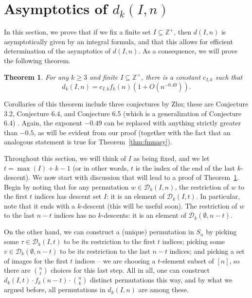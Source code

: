 \documentclass{amsart}
\newtheorem{theorem}{Theorem}[section]
\theoremstyle{definition}
\begin{document}
\section{Asymptotics of $d_k(I,n)$}\label{sec:dasy}
In this section, we prove that if we fix a finite set $I\subseteq\mathbb{Z}^+$, then $d(I,n)$ is asymptotically given by an integral formula, and that this allows for efficient determination of the asymptotics of $d(I,n)$. As a consequence, we will prove the following theorem.

\begin{theorem}\label{thm:dasy}
For any $k\geq 3$ and finite $I\subseteq \mathbb{Z}^+$, there is a constant $c_{I,k}$ such that
\[d_k(I,n)=c_{I,k} f_k(n)\left(1+O(n^{-0.49})\right).\]
\end{theorem}
Corollaries of this theorem include three conjectures by Zhu; these are Conjecture 3.2, Conjecture 6.4, and Conjecture 6.5 (which is a generalization of Conjecture 6.4) \cite{zhu2019enumerating}. Again, the exponent $-0.49$ can be replaced with anything strictly greater than $-0.5$, as will be evident from our proof (together with the fact that an analogous statement is true for Theorem~\ref{thm:fmnasy}).

Throughout this section, we will think of $I$ as being fixed, and we let $t=\max(I)+k-1$ (or in other words, $t$ is the index of the end of the last $k$-descent). We now start with discussion that will lead to a proof of Theorem~\ref{thm:dasy}.
Begin by noting that for any permutation $w\in\mathcal{D}_k(I,n)$, the restriction of $w$ to the first $t$ indices has descent set $I$: it is an element of $\mathcal{D}_k(I,t)$. In particular, note that it ends with a $k$-descent (this will be useful soon). The restriction of $w$ to the last $n-t$ indices has no $k$-descents: it is an element of $\mathcal{D}_k(\emptyset,n-t)$.

On the other hand, we can construct a (unique) permutation in $S_n$ by picking some $\tau\in \mathcal{D}_k(I,t)$ to be its restriction to the first $t$ indices; picking some $v\in \mathcal{D}_k(\emptyset,n-t)$ to be its restriction to the last $n-t$ indices; and picking a set of images for the first $t$ indices -- we are choosing a $t$-element subset of $[n]$, so there are $\binom{n}{t}$ choices for this last step. All in all, one can construct $d_k(I,t)\cdot f_k(n-t)\cdot \binom{n}{k}$ distinct permutations this way, and by what we argued before, all permutations in $d_k(I,n)$ are among these.
\end{document}
